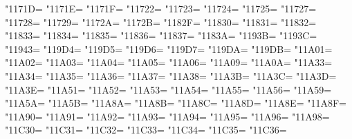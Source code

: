 \XeTeXcharclass"1171D=\KclassNum
\XeTeXcharclass"1171E=\KclassNum
\XeTeXcharclass"1171F=\KclassNum
\XeTeXcharclass"11722=\KclassNum
\XeTeXcharclass"11723=\KclassNum
\XeTeXcharclass"11724=\KclassNum
\XeTeXcharclass"11725=\KclassNum
\XeTeXcharclass"11727=\KclassNum
\XeTeXcharclass"11728=\KclassNum
\XeTeXcharclass"11729=\KclassNum
\XeTeXcharclass"1172A=\KclassNum
\XeTeXcharclass"1172B=\KclassNum
\XeTeXcharclass"1182F=\KclassNum
\XeTeXcharclass"11830=\KclassNum
\XeTeXcharclass"11831=\KclassNum
\XeTeXcharclass"11832=\KclassNum
\XeTeXcharclass"11833=\KclassNum
\XeTeXcharclass"11834=\KclassNum
\XeTeXcharclass"11835=\KclassNum
\XeTeXcharclass"11836=\KclassNum
\XeTeXcharclass"11837=\KclassNum
\XeTeXcharclass"1183A=\KclassNum
\XeTeXcharclass"1193B=\KclassNum
\XeTeXcharclass"1193C=\KclassNum
\XeTeXcharclass"11943=\KclassNum
\XeTeXcharclass"119D4=\KclassNum
\XeTeXcharclass"119D5=\KclassNum
\XeTeXcharclass"119D6=\KclassNum
\XeTeXcharclass"119D7=\KclassNum
\XeTeXcharclass"119DA=\KclassNum
\XeTeXcharclass"119DB=\KclassNum
\XeTeXcharclass"11A01=\KclassNum
\XeTeXcharclass"11A02=\KclassNum
\XeTeXcharclass"11A03=\KclassNum
\XeTeXcharclass"11A04=\KclassNum
\XeTeXcharclass"11A05=\KclassNum
\XeTeXcharclass"11A06=\KclassNum
\XeTeXcharclass"11A09=\KclassNum
\XeTeXcharclass"11A0A=\KclassNum
\XeTeXcharclass"11A33=\KclassNum
\XeTeXcharclass"11A34=\KclassNum
\XeTeXcharclass"11A35=\KclassNum
\XeTeXcharclass"11A36=\KclassNum
\XeTeXcharclass"11A37=\KclassNum
\XeTeXcharclass"11A38=\KclassNum
\XeTeXcharclass"11A3B=\KclassNum
\XeTeXcharclass"11A3C=\KclassNum
\XeTeXcharclass"11A3D=\KclassNum
\XeTeXcharclass"11A3E=\KclassNum
\XeTeXcharclass"11A51=\KclassNum
\XeTeXcharclass"11A52=\KclassNum
\XeTeXcharclass"11A53=\KclassNum
\XeTeXcharclass"11A54=\KclassNum
\XeTeXcharclass"11A55=\KclassNum
\XeTeXcharclass"11A56=\KclassNum
\XeTeXcharclass"11A59=\KclassNum
\XeTeXcharclass"11A5A=\KclassNum
\XeTeXcharclass"11A5B=\KclassNum
\XeTeXcharclass"11A8A=\KclassNum
\XeTeXcharclass"11A8B=\KclassNum
\XeTeXcharclass"11A8C=\KclassNum
\XeTeXcharclass"11A8D=\KclassNum
\XeTeXcharclass"11A8E=\KclassNum
\XeTeXcharclass"11A8F=\KclassNum
\XeTeXcharclass"11A90=\KclassNum
\XeTeXcharclass"11A91=\KclassNum
\XeTeXcharclass"11A92=\KclassNum
\XeTeXcharclass"11A93=\KclassNum
\XeTeXcharclass"11A94=\KclassNum
\XeTeXcharclass"11A95=\KclassNum
\XeTeXcharclass"11A96=\KclassNum
\XeTeXcharclass"11A98=\KclassNum
\XeTeXcharclass"11C30=\KclassNum
\XeTeXcharclass"11C31=\KclassNum
\XeTeXcharclass"11C32=\KclassNum
\XeTeXcharclass"11C33=\KclassNum
\XeTeXcharclass"11C34=\KclassNum
\XeTeXcharclass"11C35=\KclassNum
\XeTeXcharclass"11C36=\KclassNum
